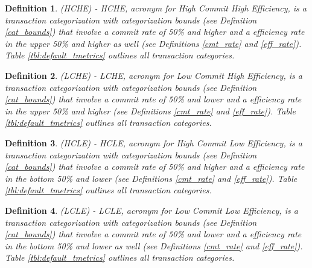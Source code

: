 \documentclass[conference]{IEEEtran}
\newtheorem{definition}{Definition}
\begin{document}

\begin{definition}
\label{min_commit}
(HCHE) - HCHE, acronym for High Commit High Efficiency, is a transaction categorization with categorization bounds (see Definition \ref{cat_bounds}) that involve a commit rate of 50\% and higher and a efficiency rate in the upper 50\% and higher as well (see Definitions \ref{cmt_rate} and \ref{eff_rate}). Table \ref{tbl:default_tmetrics} outlines all transaction categories.
\end{definition}

\begin{definition}
\label{min_abrt}
(LCHE) - LCHE, acronym for Low Commit High Efficiency, is a transaction categorization with categorization bounds (see Definition \ref{cat_bounds}) that involve a commit rate of 50\% and lower and a efficiency rate in the upper 50\% and higher (see Definitions \ref{cmt_rate} and \ref{eff_rate}). Table \ref{tbl:default_tmetrics} outlines all transaction categories.
\end{definition}

\begin{definition}
\label{ext_commit}
(HCLE) - HCLE, acronym for High Commit Low Efficiency, is a transaction categorization with categorization bounds (see Definition \ref{cat_bounds}) that involve a commit rate of 50\% and higher and a efficiency rate in the bottom 50\% and lower (see Definitions \ref{cmt_rate} and \ref{eff_rate}). Table \ref{tbl:default_tmetrics} outlines all transaction categories.
\end{definition}

\begin{definition}
\label{ext_abrt}
(LCLE) - LCLE, acronym for Low Commit Low Efficiency, is a transaction categorization with categorization bounds (see Definition \ref{cat_bounds}) that involve a commit rate of 50\% and lower and a efficiency rate in the bottom 50\% and lower as well (see Definitions \ref{cmt_rate} and \ref{eff_rate}). Table \ref{tbl:default_tmetrics} outlines all transaction categories.
\end{definition}
\end{document}
